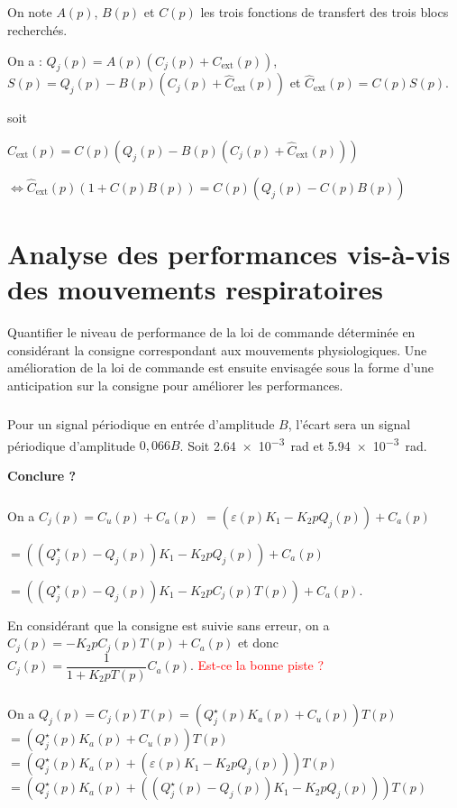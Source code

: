 \documentclass[10pt,fleqn]{article} %
\begin{document}
\subparagraph{}%
On note $A(p)$, $B(p)$ et $C(p)$ les trois fonctions de transfert des trois blocs recherchés. 


On a : $Q_j(p)=A(p)\left(C_j(p)+C_{\text{ext}}(p)\right)$, 
$S(p)=Q_j(p)-B(p)\left( C_j(p)+\hat{C}_{\text{ext}}(p) \right)$
et  $\hat{C}_{\text{ext}}(p)=C(p)S(p)$.

 soit 

$\hat{C}_{\text{ext}}(p)=C(p)\left(Q_j(p)-B(p)\left( C_j(p)+\hat{C}_{\text{ext}}(p) \right)\right)$

$\Leftrightarrow \hat{C}_{\text{ext}}(p) \left(1+ C(p)B(p)\right)=C(p)\left(Q_j(p)-C(p)B(p) \right)$

\subparagraph{}%

\subparagraph{}%

\subparagraph{}%


\section{Analyse des performances vis-à-vis des mouvements respiratoires}
\begin{obj}
Quantifier le niveau de performance de la loi de commande déterminée en considérant la consigne
correspondant aux mouvements physiologiques. Une amélioration de la loi de commande est ensuite
envisagée sous la forme d’une anticipation sur la consigne pour améliorer les performances.
\end{obj}


\subparagraph{}\textit{}%
Pour un signal périodique en entrée d'amplitude $B$, l'écart sera un signal périodique d'amplitude $0,066B$.  Soit \SI{2,64e-3}{rad} et \SI{5,94e-3}{rad}.

\textbf{Conclure ?}

\subparagraph{}\textit{}%
On a $C_j(p)=C_u(p)+C_a(p)$ 
$=\left(\varepsilon(p)K_1 - K_2 p Q_j(p)\right) + C_a(p) $

$=\left( \left( Q_j^\star (p)-Q_j(p)\right)K_1 - K_2 p Q_j(p)\right) + C_a(p) $

$=\left( \left( Q_j^\star (p)-Q_j(p)\right)K_1 - K_2 p C_j(p) T(p)\right) + C_a(p) $.

En considérant que  la consigne est suivie sans erreur, on a 
$C_j(p)= - K_2 p C_j(p) T(p) + C_a(p) $ et donc $C_j(p)=\dfrac{1}{1+K_2p T(p)}C_a(p)$.
\textcolor{red}{Est-ce la bonne piste ?}
\subparagraph{}\textit{}%

On a $Q_j(p) = C_j(p) T(p)= \left( Q_j^{\star}(p) K_a(p) + C_u(p) \right) T(p)$
$= \left( Q_j^{\star}(p) K_a(p) + C_u(p) \right) T(p)$
$= \left( Q_j^{\star}(p) K_a(p) + \left( \varepsilon(p) K_1 - K_2 p Q_j(p) \right)\right) T(p)$
$= \left( Q_j^{\star}(p) K_a(p) + \left( \left(Q_j^{\star}(p) - Q_j(p) \right) K_1 - K_2 p Q_j(p) \right)\right) T(p)$
\end{document}
